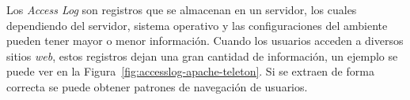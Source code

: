 Los \emph{Access Log} son registros que se almacenan en un servidor, los cuales dependiendo del servidor, sistema operativo y las configuraciones del ambiente pueden tener mayor o menor información. Cuando los usuarios acceden a diversos sitios \emph{web}, estos registros dejan una gran cantidad de información, un ejemplo se puede ver en la Figura~\ref{fig:accesslog-apache-teleton}. Si se extraen de forma correcta se puede obtener patrones de navegación de usuarios. 